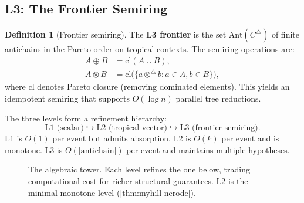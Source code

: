 \documentclass[11pt]{article}
\theoremstyle{plain}
\theoremstyle{definition}
\newtheorem{definition}[theorem]{Definition}
\theoremstyle{remark}
\newcommand{\optrop}{\otimes^{\triangle}}
\newcommand{\wstar}{{w^{\star}}}
\newcommand{\dtotal}{{d_{\mathrm{total}}}}
\newcommand{\dpre}[1][]{d_{\mathrm{pre}#1}}
\newcommand{\Ctrop}{{C^{\triangle}}}
\newcommand{\Ant}{\mathrm{Ant}}
\begin{document}
\subsection{L3: The Frontier Semiring}\label{subsec:l3}

\begin{definition}[Frontier semiring]\label{def:frontier}
The \textbf{L3 frontier} is the set $\Ant(\Ctrop)$ of finite
antichains in the Pareto order on tropical contexts.  The semiring
operations are:
\begin{align*}
  A \oplus B &= \mathrm{cl}(A \cup B),\\
  A \otimes B &= \mathrm{cl}\!\bigl(\{a \optrop b : a \in A, b \in B\}\bigr),
\end{align*}
where $\mathrm{cl}$ denotes Pareto closure (removing dominated
elements).  This yields an idempotent semiring that supports $O(\log n)$
parallel tree reductions.
\end{definition}

The three levels form a refinement hierarchy:
\[
  \text{L1 (scalar)} \hookrightarrow
  \text{L2 (tropical vector)} \hookrightarrow
  \text{L3 (frontier semiring)}.
\]
L1 is $O(1)$ per event but admits absorption.  L2 is $O(k)$ per event
and is monotone.  L3 is $O(|\text{antichain}|)$ per event and
maintains multiple hypotheses.

\begin{figure}[t]
\centering
{}
\caption{The algebraic tower.  Each level refines the one below,
  trading computational cost for richer structural guarantees.  L2 is
  the minimal monotone level (\cref{thm:myhill-nerode}).}
\label{fig:tower}
\end{figure}
\end{document}
